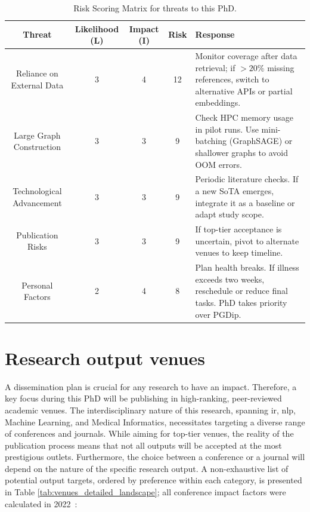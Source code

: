 \documentclass[10pt,oneside]{book}
\begin{document}
\begin{landscape}
\begin{table}[t]
\centering
\footnotesize
\begin{tabular}{|c|c|c|c|>{\raggedright\arraybackslash}p{10cm}|}
\hline
\textbf{Threat} & \textbf{Likelihood (L)} & \textbf{Impact (I)} & \textbf{Risk} & \textbf{Response} \\
\hline
Reliance on External Data & 3 & 4 & 12 &
Monitor coverage after data retrieval; if $>20\%$ missing references, switch to alternative APIs or partial embeddings. \\
\hline
Large Graph Construction & 3 & 3 & 9 & 
Check HPC memory usage in pilot runs. Use mini-batching (GraphSAGE) or shallower graphs to avoid OOM errors. \\
\hline
Technological Advancement & 3 & 3 & 9 & 
Periodic literature checks. If a new SoTA emerges, integrate it as a baseline or adapt study scope.\\
\hline
Publication Risks & 3 & 3 & 9 & 
If top-tier acceptance is uncertain, pivot to alternate venues to keep timeline. \\
\hline
Personal Factors & 2 & 4 & 8 & 
Plan health breaks. If illness exceeds two weeks, reschedule or reduce final tasks. PhD takes priority over PGDip.\\
\hline
\end{tabular}
\caption{Risk Scoring Matrix for threats to this PhD.}
\label{tab:risk_matrix}
\end{table}
\end{landscape}


\section{Research output venues}

A dissemination plan is crucial for any research to have an impact. Therefore, a key focus during this PhD will be publishing in high-ranking, peer-reviewed academic venues. The interdisciplinary nature of this research, spanning \gls*{ir}, \gls*{nlp}, Machine Learning, and Medical Informatics, necessitates targeting a diverse range of conferences and journals. While aiming for top-tier venues, the reality of the publication process means that not all outputs will be accepted at the most prestigious outlets. Furthermore, the choice between a conference or a journal will depend on the nature of the specific research output. A non-exhaustive list of potential output targets, ordered by preference within each category, is presented in Table \ref{tab:venues_detailed_landscape}; all conference impact factors were calculated in 2022~\cite{eickhoff_impact_2023}:
\end{document}
